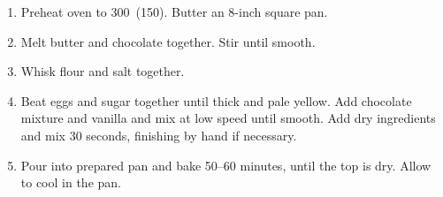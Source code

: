 
\begin{ingredients}
\end{ingredients}


\begin{recipe}
  \begin{enumerate}

  \item Preheat oven to 300\F\ (150\C).  Butter an 8-inch square pan.

  \item Melt butter and chocolate together.  Stir until smooth.

  \item Whisk flour and salt together.

  \item Beat eggs and sugar together until thick and pale yellow.  Add
    chocolate mixture and vanilla and mix at low speed until smooth.
    Add dry ingredients and mix 30 seconds, finishing by hand if
    necessary.

  \item Pour into prepared pan and bake 50--60 minutes, until the top
    is dry.  Allow to cool in the pan.

  \end{enumerate}
\end{recipe}
